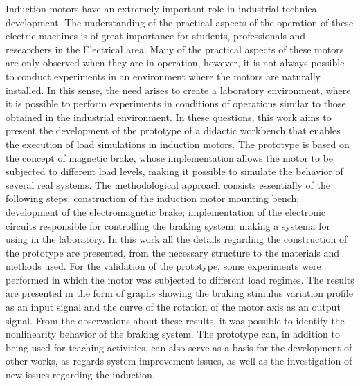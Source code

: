 Induction motors have an extremely important role in industrial technical development. The understanding of the practical aspects of the operation of these electric machines is of great importance for students, professionals and researchers in the Electrical area. Many of the practical aspects of these motors are only observed when they are in operation, however, it is not always possible to conduct experiments in an environment where the motors are naturally installed. In this sense, the need arises to create a laboratory environment, where it is possible to perform experiments in conditions of operations similar to those obtained in the industrial environment. In these questions, this work aims to present the development of the prototype of a didactic workbench that enables the execution of load simulations in induction motors. The prototype is based on the concept of magnetic brake, whose implementation allows the motor to be subjected to different load levels, making it possible to simulate the behavior of several real systems. The methodological approach consists essentially of the following steps: construction of the induction motor mounting bench; development of the electromagnetic brake; implementation of the electronic circuits responsible for controlling the braking system; making a systema for using in the laboratory. In this work all the details regarding the construction of the prototype are presented, from the necessary structure to the materials and methods used. For the validation of the prototype, some experiments were performed in which the motor was subjected to different load regimes. The results are presented in the form of graphs showing the braking stimulus variation profile as an input signal and the curve of the rotation of the motor axis as an output signal. From the observations about these results, it was possible to identify the nonlinearity behavior of the braking system. The prototype can, in addition to being used for teaching activities, can also serve as a basis for the development of other works, as regards system improvement issues, as well as the investigation of new issues regarding the induction.

